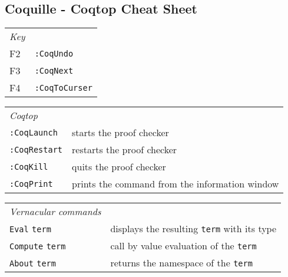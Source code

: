 \clearpage
\subsection{Coquille - Coqtop Cheat Sheet}

\begin{table}[h]
		\begin{left}
			\begin{tabular}{l|l}
			  \emph{Key}\\ 		
		      F2      & \lstinline!:CoqUndo! \\ 	     	                                                   
		      F3      & \lstinline!:CoqNext! \\         
		      F4      & \lstinline!:CoqToCurser!  
		    \end{tabular}
		\end{left}
		\label{tab:coquilleCheatSheetKeys}
	\end{table}		    
\begin{table}[h]
		\begin{left}		    	
		    \begin{tabular}{l|l}
		    \emph{Coqtop}\\
		    \lstinline!:CoqLaunch!  &   starts the proof checker\\   
		    \lstinline!:CoqRestart! &   restarts the proof checker \\       
		    \lstinline!:CoqKill!    &   quits the proof checker \\        
		    \lstinline!:CoqPrint!   &   prints the command from the information window \\
		    \end{tabular}
		    \label{tab:coquilleCheatSheetCoqTop}
		\end{left} 
	\end{table}	
			    
\begin{table}[h]
   \begin{left}		     	  
     	     \begin{tabular}{l|l}
     	     
     	     \emph{Vernacular commands}\\
		          \lstinline!Eval!  \texttt{term}     & displays the resulting \texttt{term} with its type  \\  
		          \lstinline!Compute! \texttt{term}   & call by value evaluation of the \texttt{term} \\          	          
		          \lstinline!About! \texttt{term}     & returns the namespace of the \texttt{term}
	   		\end{tabular}
	   			\label{tab:coquilleCheatSheetVernacular}
		\end{left} 
	\end{table}		  

